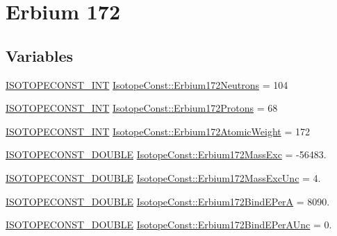 \hypertarget{group___isotope_const-_erbium-_er172}{}\section{Erbium 172}
\label{group___isotope_const-_erbium-_er172}
\subsection*{Variables}
\begin{DoxyCompactItemize}
\item 
\mbox{\hyperlink{group___isotope_const-_macros_ga5f18360b3e99483a35c32d789e62621c}{I\+S\+O\+T\+O\+P\+E\+C\+O\+N\+S\+T\+\_\+\+I\+NT}} \mbox{\hyperlink{group___isotope_const-_erbium-_er172_ga102d35b3aab884bdb187670c5e0197d5}{Isotope\+Const\+::\+Erbium172\+Neutrons}} = 104
\item 
\mbox{\hyperlink{group___isotope_const-_macros_ga5f18360b3e99483a35c32d789e62621c}{I\+S\+O\+T\+O\+P\+E\+C\+O\+N\+S\+T\+\_\+\+I\+NT}} \mbox{\hyperlink{group___isotope_const-_erbium-_er172_gaacfc3916952e7ed8cdb6d147c2e807fa}{Isotope\+Const\+::\+Erbium172\+Protons}} = 68
\item 
\mbox{\hyperlink{group___isotope_const-_macros_ga5f18360b3e99483a35c32d789e62621c}{I\+S\+O\+T\+O\+P\+E\+C\+O\+N\+S\+T\+\_\+\+I\+NT}} \mbox{\hyperlink{group___isotope_const-_erbium-_er172_ga103e0617b926bcef9b47385338011970}{Isotope\+Const\+::\+Erbium172\+Atomic\+Weight}} = 172
\item 
\mbox{\hyperlink{group___isotope_const-_macros_ga8f45a7272ce02c0b4c65c44636ed719a}{I\+S\+O\+T\+O\+P\+E\+C\+O\+N\+S\+T\+\_\+\+D\+O\+U\+B\+LE}} \mbox{\hyperlink{group___isotope_const-_erbium-_er172_ga1888d9ebc7ef469c25637feee0a0050b}{Isotope\+Const\+::\+Erbium172\+Mass\+Exc}} = -\/56483.
\item 
\mbox{\hyperlink{group___isotope_const-_macros_ga8f45a7272ce02c0b4c65c44636ed719a}{I\+S\+O\+T\+O\+P\+E\+C\+O\+N\+S\+T\+\_\+\+D\+O\+U\+B\+LE}} \mbox{\hyperlink{group___isotope_const-_erbium-_er172_gad0dbd52b92698ef3abdabd0702c92474}{Isotope\+Const\+::\+Erbium172\+Mass\+Exc\+Unc}} = 4.
\item 
\mbox{\hyperlink{group___isotope_const-_macros_ga8f45a7272ce02c0b4c65c44636ed719a}{I\+S\+O\+T\+O\+P\+E\+C\+O\+N\+S\+T\+\_\+\+D\+O\+U\+B\+LE}} \mbox{\hyperlink{group___isotope_const-_erbium-_er172_ga94f502c819321a9e47cc877585245007}{Isotope\+Const\+::\+Erbium172\+Bind\+E\+PerA}} = 8090.
\item 
\mbox{\hyperlink{group___isotope_const-_macros_ga8f45a7272ce02c0b4c65c44636ed719a}{I\+S\+O\+T\+O\+P\+E\+C\+O\+N\+S\+T\+\_\+\+D\+O\+U\+B\+LE}} \mbox{\hyperlink{group___isotope_const-_erbium-_er172_gacdd0ddf70ed9783c8dca40c9b6b05134}{Isotope\+Const\+::\+Erbium172\+Bind\+E\+Per\+A\+Unc}} = 0.

\end{DoxyCompactItemize}
